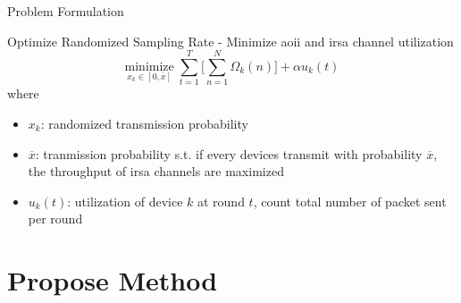 \documentclass[9pt]{beamer}
\begin{document}
\begin{frame}{Problem Formulation}
    \begin{block}{Optimize Randomized Sampling Rate - Minimize \gls{aoii} and \gls{irsa} channel utilization}
        \begin{equation}
            \underset{x_k \in [0, \overline{x}]}{\text{minimize}} \; \sum_{t=1}^T \Big[ \sum_{n=1}^{N} \Omega_k(n) \Big] + \alpha u_k(t)
        \end{equation}
        where
        \begin{itemize}
            \item $x_k$: randomized transmission probability
            \item $\overline{x}$: tranmission probability s.t. if every devices transmit with probability $\overline{x}$, the throughput of \gls{irsa} channels are maximized
            \item $u_k(t)$: utilization of device $k$ at round $t$, count total number of packet sent per round
        \end{itemize}
    \end{block}
\end{frame}

\section{Propose Method}
\end{document}
